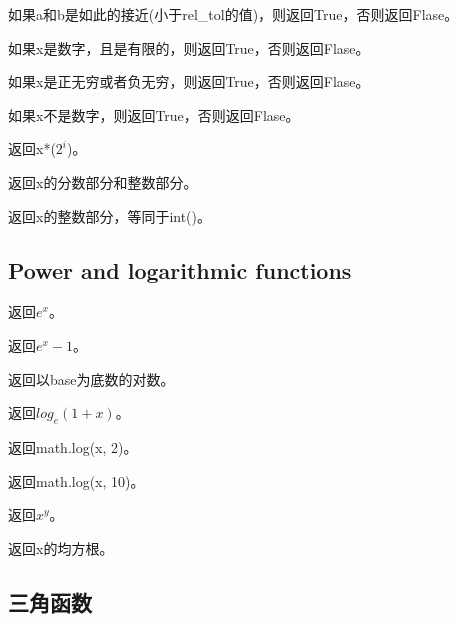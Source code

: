 \noindent{\color{red}{math.isclose(a, b, *, rel\_tol=1e-09, abs\_tol=0.0):}}
\par{如果a和b是如此的接近(小于rel\_tol的值)，则返回True，否则返回Flase。}\\

\noindent{\color{red}{math.isfinite(x):}}
\par{如果x是数字，且是有限的，则返回True，否则返回Flase。}\\

\noindent{\color{red}{math.isinf(x):}}
\par{如果x是正无穷或者负无穷，则返回True，否则返回Flase。}\\

\noindent{\color{red}{math.isnan(x):}}
\par{如果x不是数字，则返回True，否则返回Flase。}\\

\noindent{\color{red}{math.ldexp(x, i):}}
\par{返回x*($2^i$)。}\\

\noindent{\color{red}{math.modf(x):}}
\par{返回x的分数部分和整数部分。}\\

\noindent{\color{red}{math.trunc(x):}}
\par{返回x的整数部分，等同于int()。}\\

\subsection{Power and logarithmic functions}
\noindent{\color{red}{math.exp(x):}}
\par{返回$e^x$。}\\

\noindent{\color{red}{math.expm1(x):}}
\par{返回$e^x-1$。}\\

\noindent{\color{red}{math.log(x[, base]):}}
\par{返回以base为底数的对数。}\\

\noindent{\color{red}{math.loglp(x):}}
\par{返回$log_{e}(1+x)$。}\\

\noindent{\color{red}{math.log2(x):}}
\par{返回math.log(x, 2)。}\\

\noindent{\color{red}{math.log10(x):}}
\par{返回math.log(x, 10)。}\\

\noindent{\color{red}{math.pow(x, y):}}
\par{返回$x^y$。}\\

\noindent{\color{red}{math.sqrt(x):}}
\par{返回x的均方根。}\\

\subsection{三角函数}
